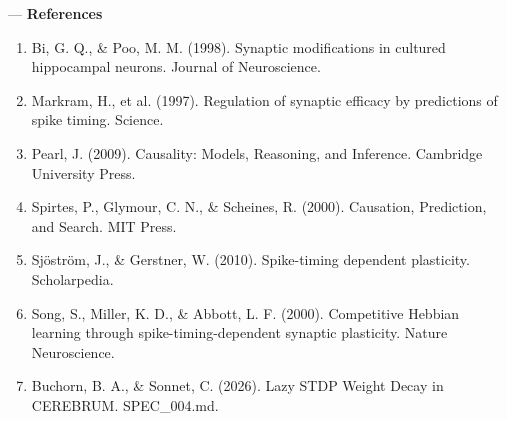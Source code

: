 ---
\textbf{References}
\begin{enumerate}
\item Bi, G. Q., \& Poo, M. M. (1998). Synaptic modif\-ications in cultured hippocampal neurons. Journal of Neuros\-cience.
\item Markram, H., et al. (1997). Regulation of synaptic efficacy by predictions of spike timing. Science.
\item Pearl, J. (2009). Causality: Models, Reasoning, and Inference. Cambridge University Press.
\item Spirtes, P., Glymour, C. N., \& Scheines, R. (2000). Causation, Prediction, and Search. MIT Press.
\item Sjöström, J., \& Gerstner, W. (2010). Spike-timing dependent plasticity. Schola\-rpedia.
\item Song, S., Miller, K. D., \& Abbott, L. F. (2000). Competitive Hebbian learning through spike-timing-dependent synaptic plasticity. Nature Neuros\-cience.
\item Buchorn, B. A., \& Sonnet, C. (2026). Lazy STDP Weight Decay in CEREBRUM. SPEC\_004.md.

\end{enumerate}